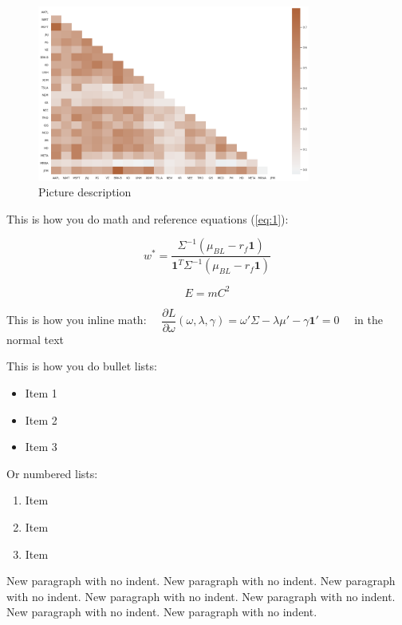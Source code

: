 \begin{figure}[ht]
    \begin{center}
        \includegraphics[width=0.8\textwidth]{img/fig1.png}
        \caption{Picture description}
        \label{fig:figure1}
    \end{center}
\end{figure}

This is how you do math and reference equations (\ref{eq:1}):

\begin{equation} \label{eq:1}
    w^*=\frac{\Sigma^{-1}(\mu_{BL}-r_f\mathbf{1})}{\mathbf{1}^T\Sigma^{-1}(\mu_{BL}-r_f\mathbf{1})}   
\end{equation}

$$
E = mC^2
$$

This is how you inline math: 
$\quad \dfrac{\partial L}{\partial \omega}(\omega, \lambda, \gamma) = \omega'\Sigma - \lambda\mu' - \gamma\mathbf{1}' = 0 \quad$ 
in the normal text

This is how you do bullet lists:

\begin{itemize}
    \item Item 1
    \item Item 2
    \item Item 3
\end{itemize}

Or numbered lists:

\begin{enumerate}
    \item Item
    \item Item
    \item Item
\end{enumerate}

\noindent
New paragraph with no indent. New paragraph with no indent. New paragraph with no indent. New paragraph with no indent. New paragraph with no indent. New paragraph with no indent. New paragraph with no indent.

